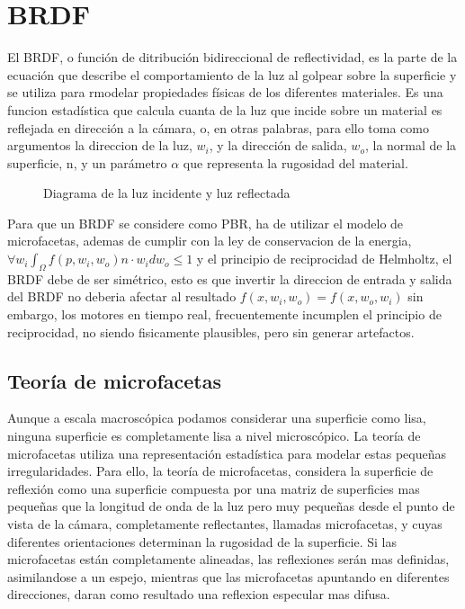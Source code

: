 \section{BRDF}

El BRDF, o función de ditribuci\'on bidireccional de reflectividad, es la parte de la ecuaci\'on que describe el
comportamiento de la luz al golpear sobre la superficie y se utiliza para rmodelar propiedades f\'isicas de los diferentes
materiales. Es una funcion estad\'istica que calcula cuanta de la luz que incide sobre un material es reflejada en direcci\'on
a la c\'amara, o, en otras palabras, para ello toma como argumentos la direccion de la luz, $w_i$, y la dirección de salida,
$w_o$, la normal de la superficie, n, y un par\'ametro $\alpha$ que representa la rugosidad del material.

\begin{figure}[H]
    \vspace{0.5cm}
    \centering
    \caption{Diagrama de la luz incidente y luz reflectada}
    \vspace{0.5cm}
\end{figure}

Para que un BRDF se considere como PBR, ha de utilizar el modelo de microfacetas, ademas de cumplir con la ley de conservacion
de la energia, $\forall w_i \int_{\Omega} f(p, w_i, w_o) n\cdot{w_i} dw_o \leq 1$ y el principio de reciprocidad de Helmholtz,
el BRDF debe de ser simétrico, esto es que invertir la direccion de entrada y salida del BRDF no deberia afectar al resultado
$f(x, w_i, w_o) = f(x, w_o, w_i)$ sin embargo, los motores en tiempo real, frecuentemente incumplen el principio de reciprocidad,
no siendo fisicamente plausibles, pero sin generar artefactos.\\

    \subsection{Teor\'ia de microfacetas}

    \bgroup

        Aunque a escala macrosc\'opica podamos considerar una superficie como lisa, ninguna superficie es completamente lisa a nivel
        microsc\'opico. La teor\'ia de microfacetas utiliza una representaci\'on estad\'istica para modelar estas peque\~nas irregularidades.
        Para ello, la teor\'ia de microfacetas, considera la superficie de reflexi\'on como una superficie compuesta por una matriz de
        superficies mas peque\~nas que la longitud de onda de la luz pero muy peque\~nas desde el punto de vista de la c\'amara,
        completamente reflectantes, llamadas microfacetas, y cuyas diferentes orientaciones determinan la rugosidad de la superficie.
        Si las microfacetas est\'an completamente alineadas, las reflexiones ser\'an mas definidas, asimilandose a un espejo, mientras
        que las microfacetas apuntando en diferentes direcciones, daran como resultado una reflexion especular mas difusa.

